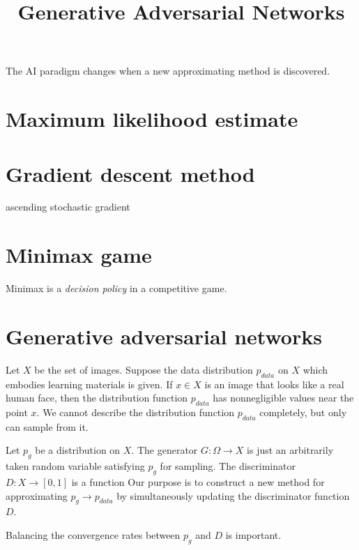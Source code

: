 \documentclass{../exp}
\title{Generative Adversarial Networks}
\begin{document}
\maketitle

The AI paradigm changes when a new approximating method is discovered.

\section{Maximum likelihood estimate}

\section{Gradient descent method}
ascending stochastic gradient


\section{Minimax game}

Minimax is a \emph{decision policy} in a competitive game.

\section{Generative adversarial networks}
Let $X$ be the set of images.
Suppose the data distribution $p_{data}$ on $X$ which embodies learning materials is given.
If $x\in X$ is an image that looks like a real human face, then the distribution function $p_{data}$ has nonnegligible values near the point $x$.
We cannot describe the distribution function $p_{data}$ completely, but only can sample from it.

Let $p_g$ be a distribution on $X$.
The generator $G:\Omega\to X$ is just an arbitrarily taken random variable satisfying $p_g$ for sampling.
The discriminator $D:X\to[0,1]$ is a function
Our purpose is to construct a new method for approximating $p_g\to p_{data}$ by simultaneously updating the discriminator function $D$.


Balancing the convergence rates between $p_g$ and $D$ is important.
\end{document}

